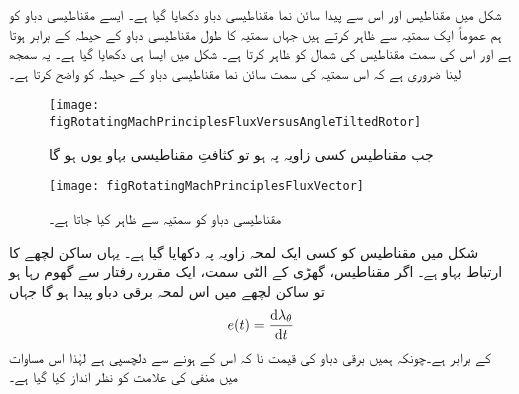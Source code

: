 شکل   میں مقناطیس اور اس سے پیدا سائن نما مقناطیسی دباو دکھایا گیا ہے۔ ایسے مقناطیسی دباو کو ہم عموماً ایک سمتیہ سے ظاہر کرتے ہیں جہاں سمتیہ کا طول مقناطیسی دباو کے حیطہ کے برابر ہوتا ہے اور اس کی سمت مقناطیس کی شمال کو ظاہر کرتا ہے۔ شکل   میں ایسا ہی دکھایا گیا ہے۔ یہ سمجھ لینا ضروری ہے کہ اس سمتیہ کی سمت سائن نما مقناطیسی دباو کے حیطہ کو واضح کرتا ہے۔ 
\begin{figure}
\centering
\texttt{[image: figRotatingMachPrinciplesFluxVersusAngleTiltedRotor]}
\caption{جب مقناطیس کسی زاویہ پہ ہو تو کثافتِ مقناطیسی بہاو یوں ہو گا}
\label{شکل_گھومتے_مشین_رداس_اور_مقناطیسی_بہاو_مقناطیس_گھوما_ہے}
\end{figure}
%
\begin{figure}
\centering
\texttt{[image: figRotatingMachPrinciplesFluxVector]}
\caption{مقناطیسی دباو کو سمتیہ سے ظاہر کیا جاتا ہے۔}
\label{شکل_گھومتے_مشین_مقناطیسی_دباو_سمتیہ}
\end{figure}

 شکل   میں مقناطیس کو کسی ایک لمحہ   زاویہ  پہ دکھایا گیا ہے۔ یہاں ساکن لچھے کا ارتباط بہاو  ہے۔ اگر مقناطیس، گھڑی کے الٹی سمت، ایک مقررہ رفتار  سے  گھوم رہا ہو تو ساکن لچھے میں اس لمحہ  برقی دباو پیدا ہو گا جہاں
\begin{align}
e(t)=\frac{\dif \lambda_\theta}{\dif t}
\end{align}
کے برابر ہے۔چونکہ ہمیں برقی دباو کی قیمت نا کہ اس کے  ہونے سے دلچسپی ہے لہٰذا اس مساوات میں منفی کی علامت کو نظر انداز کیا گیا ہے۔

